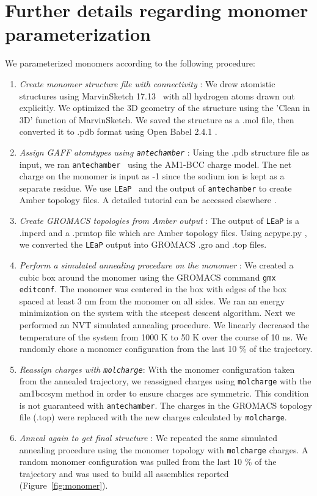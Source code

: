 \documentclass[journal=jpcbfk,manusciprt=article]{achemso}
\begin{document}
  \section{Further details regarding monomer parameterization}\label{section:parameterization}
 
  \vspace{1em}
  We parameterized monomers according to the following procedure:
  \begin{enumerate}
	\item \textit{Create monomer structure file with connectivity} : We
	drew atomistic structures using MarvinSketch
	17.13~\cite{chemaxon_marvinsketch_2017} with all hydrogen atoms drawn out
	explicitly. We optimized the 3D geometry of the structure using the 'Clean in
	3D' function of MarvinSketch.  We saved the structure as a .mol file, then
	converted it to .pdb format using Open Babel 2.4.1
	\cite{oboyle_open_2011,noauthor_open_nodate}. 
	\item \textit{Assign GAFF atomtypes using \texttt{antechamber}} : Using
	the .pdb structure file as input, we ran
	\texttt{antechamber}~\cite{wang_automatic_2006} using the AM1-BCC charge model.
	The net charge on the monomer is input as -1 since the sodium ion is kept as 
	a separate residue. We use \texttt{LEaP}~\cite{case_ambertools16_2016} and the
	output of \texttt{antechamber} to create Amber topology files. A detailed
	tutorial can be accessed elsewhere \cite{walker_antechamber_nodate}.
	\item \textit{Create GROMACS topologies from Amber output} : The output
	of \texttt{LEaP} is a .inpcrd and a .prmtop file which are Amber topology
	files. Using acpype.py \cite{sousa_da_silva_acpype_2012}, we converted the
	\texttt{LEaP} output into GROMACS .gro and .top files. 
	\item \textit{Perform a simulated annealing procedure on the monomer} :
	We created a cubic box around the monomer using the GROMACS command \texttt{gmx
	editconf}. The monomer was centered in the box with edges of the
	box spaced at least 3 nm from the monomer on all sides. We ran an energy minimization
	on the system with the steepest descent algorithm. Next we performed an NVT
	simulated annealing procedure. We linearly decreased the temperature of the
	system from 1000 K to 50 K over the course of 10 ns. We randomly chose a monomer
	configuration from the last 10 \% of the trajectory. 
	\item \textit{Reassign charges with \texttt{molcharge}}: With the monomer
	configuration taken from the annealed trajectory, we reassigned charges using
	\texttt{molcharge} with the am1bccsym method in order to ensure charges 
	are symmetric. This condition is not guaranteed with \texttt{antechamber}. 
	The charges in the GROMACS topology file (.top) were replaced with the 
	new charges calculated by \texttt{molcharge}. 
	\item \textit{Anneal again to get final structure} : We repeated the
	same simulated annealing procedure using the monomer topology with
	\texttt{molcharge} charges. A random monomer configuration was pulled from the
	last 10 \% of the trajectory and was used to build all assemblies reported
	(Figure~\ref{fig:monomer}).
  \end{enumerate} 
\end{document}
